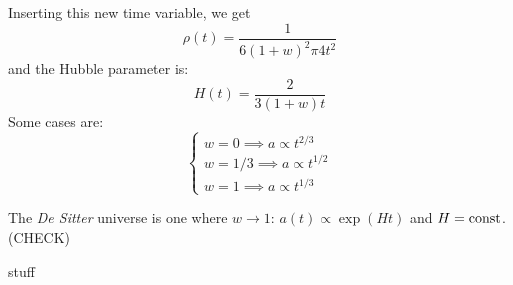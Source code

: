 \documentclass[main.tex]{subfiles}
\begin{document}
Inserting this new time variable, we get
\begin{equation}
  \rho(t) = \frac{1}{6 (1+w)^2 \pi 4 t^2}
\end{equation}
and the Hubble parameter is:
\begin{equation}
  H(t) = \frac{2}{3(1+w) t}
\end{equation}
Some cases are:
\begin{equation}
  \begin{cases}
      w = 0 \implies a \propto t^{2/3}  \\
      w=1/3 \implies a \propto t^{1/2} \\  
      w=1 \implies a \propto t^{1/3}  
  \end{cases}
\end{equation}

The \emph{De Sitter} universe is one where \(w \rightarrow 1\): \(a(t) \propto \exp(Ht) \) and \(H = \text{const}\). (CHECK) 

stuff
\end{document}
